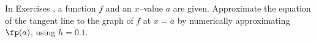 {\noindent In Exercises}
{, a function $f$ and an $x$--value $a$ are given. Approximate the equation of the tangent line to the graph of $f$ at $x=a$ by numerically approximating $\fp(a)$, using $h=0.1$.
}
